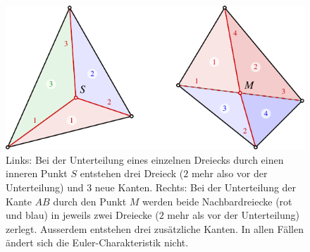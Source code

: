 %
%
%
\begin{figure}
\centering
\includegraphics{chapters/120-topologie/images/unterteilung.pdf}
\caption{Links: Bei der Unterteilung eines einzelnen Dreiecks durch einen
inneren Punkt $S$ entstehen drei Dreieck ($2$ mehr also vor der Unterteilung)
und 3 neue Kanten.
Rechts: Bei der Unterteilung der Kante $AB$ durch den Punkt $M$ werden
%
beide Nachbardreiecke (rot und blau) in jeweils zwei Dreiecke
($2$ mehr als vor der Unterteilung) zerlegt.
Ausserdem entstehen drei zusätzliche Kanten.
In allen Fällen ändert sich die Euler-Charakteristik nicht.
\label{buch:topologie:eulercharakteristik:fig:unterteilung}}
\end{figure}
